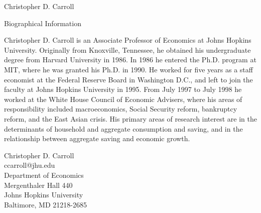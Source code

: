 \documentclass[11pt]{article}
\begin{document}
\centerline{Christopher D. Carroll}
\centerline{Biographical Information}


\medskip\medskip


Christopher D. Carroll is an Associate Professor of Economics at Johns 
Hopkins University.  Originally from Knoxville, Tennessee, he obtained 
his undergraduate degree from Harvard University in 1986.  In 1986 he 
entered the Ph.D. program at MIT, where he was granted his Ph.D. in 
1990.  He worked for five years as a staff economist at the Federal 
Reserve Board in Washington D.C., and left to join the faculty at 
Johns Hopkins University in 1995.  From July 1997 to July 1998 he 
worked at the White House Council of Economic Advisers, where his 
areas of responsibility included macroeconomics, Social Security 
reform, bankruptcy reform, and the East Asian crisis.  His primary 
areas of research interest are in the determinants of household and 
aggregate consumption and saving, and in the relationship between 
aggregate saving and economic growth.

\medskip\medskip\medskip
\raggedleft

Christopher D. Carroll \\
ccarroll@jhu.edu \\
Department of Economics \\
Mergenthaler Hall 440 \\
Johns Hopkins University \\
Baltimore, MD  21218-2685 \\


\raggedright



\end{document}
